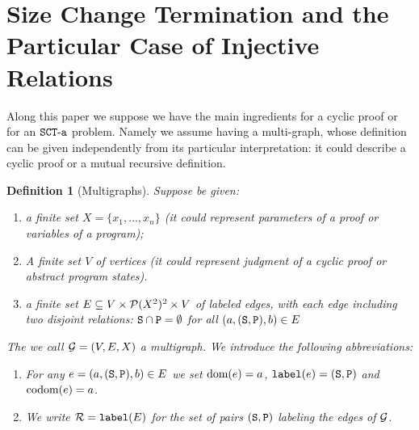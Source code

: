 \documentclass{lmcs}
\newtheorem{definition}[theorem]{Definition}
\begin{document}
\section{Size Change Termination and the Particular Case of Injective Relations}
\label{section-SCT}

Along this paper we suppose we have the main ingredients for a cyclic proof
or for an ${\tt SCT\mbox{-}a}$ problem.
Namely we assume having a multi-graph, whose definition can be given independently
from its particular interpretation: it could describe
a cyclic proof or a mutual recursive definition.


\begin{definition}[Multigraphs]
\label{definition-multigraph}
Suppose be given:

\begin{enumerate}
\item
a \emph{finite set} $X = \{ x_1, \ldots, x_n \} $
 (it could represent parameters of a proof or variables of a program);

\item
A finite set $V$ of vertices
 (it could represent judgment of a cyclic proof or abstract program states).


\item
a finite set 
$E \subseteq V \times {\mathcal P}(X^2)^2 \times V$ of labeled edges,
with each edge including two disjoint relations:
 \emph{${\tt S} \cap {\tt P} = \emptyset$ for all $(a,({\tt S}, {\tt P}),b) \in E$}
\end{enumerate}

The we call ${\mathcal G}= (V,E,X)$ a multigraph. We introduce the following abbreviations:

\begin{enumerate}
\item
For any $e = (a, ({\tt S}, {\tt P}), b) \in E$ we set  
${\rm dom}(e) = a$, ${\tt label}(e) = ({\tt S}, {\tt P})$ and ${\rm codom}(e) = a$.

\item
We write ${\mathcal R} = {\tt label}(E)$ for the set of pairs $({\tt S}, {\tt P})$ 
labeling the edges of ${\mathcal G}$.
\end{enumerate}
\end{definition}
\end{document}
